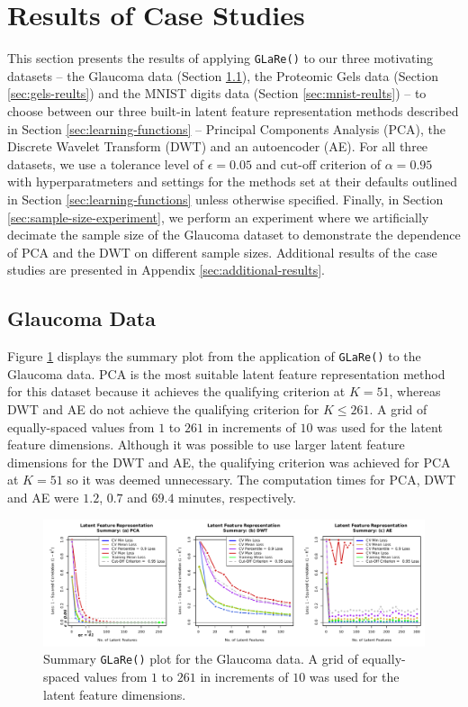 \section{Results of Case Studies}\label{sec:results}

This section presents the results of applying \texttt{GLaRe()} to our three motivating datasets --  the Glaucoma data (Section \ref{sec:glaucoma-reults}), the Proteomic Gels data (Section \ref{sec:gels-reults}) and the MNIST digits data (Section \ref{sec:mnist-reults}) -- to choose between our three built-in latent feature representation methods described in Section \ref{sec:learning-functions} -- Principal Components Analysis (PCA), the Discrete Wavelet Transform (DWT) and an autoencoder (AE).
For all three datasets, we use a tolerance level of $\epsilon = 0.05$ and cut-off criterion of $\alpha=0.95$ with hyperparatmeters and settings for the methods set at their defaults outlined in Section \ref{sec:learning-functions} unless otherwise specified.
Finally, in Section \ref{sec:sample-size-experiment}, we perform an experiment where we artificially decimate the sample size of the Glaucoma dataset to demonstrate the dependence of PCA and the DWT on different sample sizes.
Additional results of the case studies are presented in Appendix \ref{sec:additional-results}.

\subsection{Glaucoma Data}\label{sec:glaucoma-reults}

Figure \ref{fig:eye-results} displays the summary plot from the application of \texttt{GLaRe()} to the Glaucoma data.
PCA is the most suitable latent feature representation method for this dataset because it achieves the qualifying criterion at $K=51$, whereas DWT and AE do not achieve the qualifying criterion for $K \leq 261$.
A grid of equally-spaced values from $1$ to $261$ in increments of $10$ was used for the latent feature dimensions. 
Although it was possible to use larger latent feature dimensions for the DWT and AE, the qualifying criterion was achieved for PCA at $K=51$ so it was deemed unnecessary.
The computation times for PCA, DWT and AE were $1.2$, $0.7$ and $69.4$ minutes, respectively.


\begin{figure}
    \centering
    \includegraphics[width=1\textwidth]{figures/eye-results.pdf}
    \caption{Summary \texttt{GLaRe()} plot for the Glaucoma data. A grid of equally-spaced values from $1$ to $261$ in increments of $10$ was used for the latent feature dimensions.}
    \label{fig:eye-results}
\end{figure}

